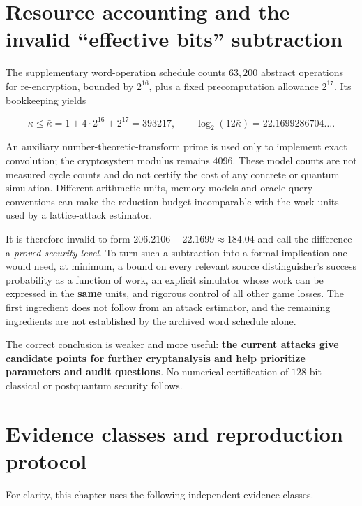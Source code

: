 \documentclass[
  11pt,
  a4paper,
  oneside]{report}
\begin{document}
\section{Resource accounting and the invalid ``effective bits''
subtraction}\label{resource-accounting-and-the-invalid-effective-bits-subtraction}

The supplementary word-operation schedule counts \(63{,}200\) abstract
operations for re-encryption, bounded by \(2^{16}\), plus a fixed
precomputation allowance \(2^{17}\). Its bookkeeping yields

\[
\kappa\le\bar\kappa=1+4\cdot2^{16}+2^{17}=393217,
\qquad\log_2(12\bar\kappa)=22.1699286704\ldots.
\]

An auxiliary number-theoretic-transform prime is used only to implement
exact convolution; the cryptosystem modulus remains \(4096\). These
model counts are not measured cycle counts and do not certify the cost
of any concrete or quantum simulation. Different arithmetic units,
memory models and oracle-query conventions can make the reduction budget
incomparable with the work units used by a lattice-attack estimator.

It is therefore invalid to form \(206.2106-22.1699\approx184.04\) and
call the difference a \emph{proved security level}. To turn such a
subtraction into a formal implication one would need, at minimum, a
bound on every relevant source distinguisher's success probability as a
function of work, an explicit simulator whose work can be expressed in
the \textbf{same} units, and rigorous control of all other game losses.
The first ingredient does not follow from an attack estimator, and the
remaining ingredients are not established by the archived word schedule
alone.

The correct conclusion is weaker and more useful: \textbf{the current
attacks give candidate points for further cryptanalysis and help
prioritize parameters and audit questions}. No numerical certification
of \(128\)-bit classical or postquantum security follows.

\section{Evidence classes and reproduction
protocol}\label{evidence-classes-and-reproduction-protocol}

For clarity, this chapter uses the following independent evidence
classes.
\end{document}
